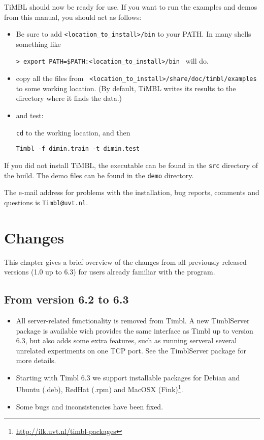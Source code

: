 \documentclass{report}
\begin{document}
TiMBL should now be ready for use. If you want to run the examples and demos from this manual, you should act as follows:

\begin{itemize}
\item Be sure to add {\tt <location\_to\_install>/bin} to your PATH. 
In many shells something like

 {\tt > export PATH=\$PATH:<location\_to\_install>/bin }
will do.
\item copy all the files from {\tt
  <location\_to\_install>/share/doc/timbl/examples} to some working
location. (By default, TiMBL writes its results to the directory where
it finds the data.)
\item and test:

{\tt cd} to the working location, and then

{\tt Timbl -f dimin.train -t dimin.test}
\end{itemize}

If you did not install TiMBL, the executable can be found in the {\tt src} directory of the build. The demo files can be found in the {\tt demo} directory.

The e-mail address for problems with the installation, bug reports, comments and questions is {\tt Timbl@uvt.nl}.

\chapter{Changes}
\label{changes}

This chapter gives a brief overview of the changes from all previously released versions (1.0 up to 6.3) for users already familiar with the program.

\section{From version 6.2 to 6.3}

\begin{itemize}
\item All server-related functionality is removed from Timbl. A new
  TimblServer package is available wich provides the same interface as
  Timbl up to version 6.3, but also adds some extra features, such as
  running serveral several unrelated experiments on one TCP port. See
  the TimblServer package for more details.

\item Starting with Timbl 6.3 we support installable packages for
  Debian and Ubuntu (.deb), RedHat (.rpm) and MacOSX
  (Fink)\footnote{\url{http://ilk.uvt.nl/timbl-packages}}.

\item Some bugs and inconsistencies have been fixed.

\end{itemize}
\end{document}
